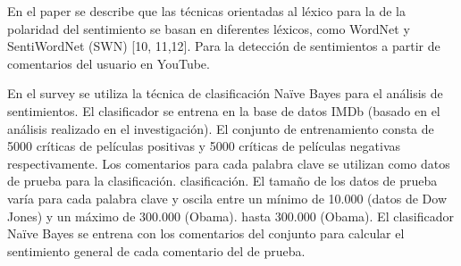 \documentclass[conference]{IEEEtran}
\begin{document}
 En el paper \cite{8}  se describe que las técnicas orientadas al léxico para la
 de la polaridad del sentimiento se basan en 
 diferentes léxicos, como WordNet y
 SentiWordNet (SWN) [10, 11,12]. Para la detección de sentimientos a partir de comentarios del usuario en YouTube.

 En el survey \cite{9} se utiliza la técnica de clasificación Naïve Bayes para el análisis de sentimientos. El clasificador se entrena en la
 base de datos IMDb (basado en el análisis realizado en el
 investigación). El conjunto de entrenamiento consta de 5000 críticas de películas positivas y
 5000 críticas de películas negativas respectivamente. Los comentarios
 para cada palabra clave se utilizan como datos de prueba para la clasificación.
 clasificación. El tamaño de los datos de prueba varía para cada palabra clave y oscila entre un mínimo de 10.000 (datos de Dow Jones) y un máximo de 300.000 (Obama).
 hasta 300.000 (Obama). El clasificador Naïve Bayes se entrena con los comentarios del conjunto
 para calcular el sentimiento general de cada comentario del
 de prueba.
\end{document}
